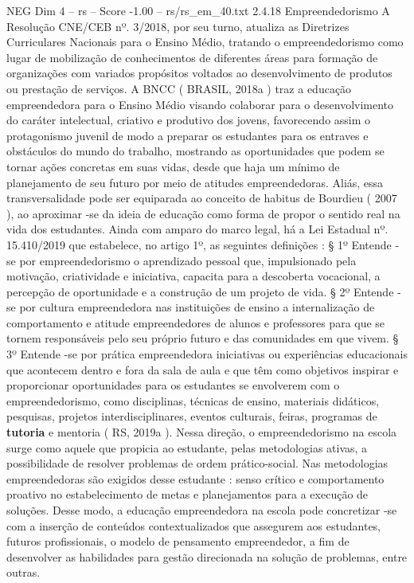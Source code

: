 \begin{textsample}{NEG Dim 4 – rs – Score -1.00 – rs/rs\_em\_40.txt}  \label{ex:f4_neg_193}
2.4.18 Empreendedorismo A Resolução CNE/CEB nº. 3/2018, por seu turno, atualiza as Diretrizes Curriculares Nacionais para o Ensino Médio, tratando o empreendedorismo como lugar de mobilização de conhecimentos de diferentes áreas para formação de organizações com variados propósitos voltados ao desenvolvimento de produtos ou prestação de serviços.
A BNCC ( BRASIL, 2018a ) traz a educação empreendedora para o Ensino Médio visando colaborar para o desenvolvimento do caráter intelectual, criativo e produtivo dos jovens, favorecendo assim o protagonismo juvenil de modo a preparar os estudantes para os entraves e obstáculos do mundo do trabalho, mostrando as oportunidades que podem se tornar ações concretas em suas vidas, desde que haja um mínimo de planejamento de seu futuro por meio de atitudes empreendedoras.
Aliás, essa transversalidade pode ser equiparada ao conceito de habitus de Bourdieu ( 2007 ), ao aproximar -se da ideia de educação como forma de propor o sentido real na vida dos estudantes.
Ainda com amparo do marco legal, há a Lei Estadual nº. 15.410/2019 que estabelece, no artigo 1º, as seguintes definições : § 1º Entende -se por empreendedorismo o aprendizado pessoal que, impulsionado pela motivação, criatividade e iniciativa, capacita para a descoberta vocacional, a percepção de oportunidade e a construção de um projeto de vida. § 2º Entende -se por cultura empreendedora nas instituições de ensino a internalização de comportamento e atitude empreendedores de alunos e professores para que se tornem responsáveis pelo seu próprio futuro e das comunidades em que vivem. § 3º Entende -se por prática empreendedora iniciativas ou experiências educacionais que acontecem dentro e fora da sala de aula e que têm como objetivos inspirar e proporcionar oportunidades para os estudantes se envolverem com o empreendedorismo, como disciplinas, técnicas de ensino, materiais didáticos, pesquisas, projetos interdisciplinares, eventos culturais, feiras, programas de \textbf{tutoria} e mentoria ( RS, 2019a ).
Nessa direção, o empreendedorismo na escola surge como aquele que propicia ao estudante, pelas metodologias ativas, a possibilidade de resolver problemas de ordem prático-social.
Nas metodologias empreendedoras são exigidos desse estudante : senso crítico e comportamento proativo no estabelecimento de metas e planejamentos para a execução de soluções.
Desse modo, a educação empreendedora na escola pode concretizar -se com a inserção de conteúdos contextualizados que assegurem aos estudantes, futuros profissionais, o modelo de pensamento empreendedor, a fim de desenvolver as habilidades para gestão direcionada na solução de problemas, entre outras.

\end{textsample}
